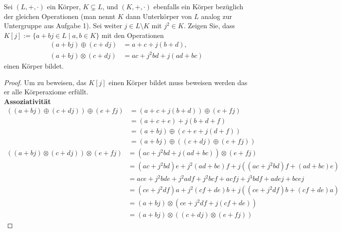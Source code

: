 \documentclass{../problemset}
\begin{document}
\pagebreak

\begin{problem}
Sei $(L, +, \cdot)$ ein Körper, $K \subsetneq L$, und $(K, +, \cdot)$ ebenfalls ein Körper bezüglich der gleichen Operationen (man nennt $K$ dann Unterkörper von $L$ analog zur Untergruppe aus Aufgabe 1). Sei weiter $j \in L \setminus K$ mit $j^2 \in K$. Zeigen Sie, dass $K[j] := \{a + bj \in L \mid a, b \in K\}$ mit den Operationen
\begin{align*}
	(a + bj) \oplus (c + dj)  & = a + c + j(b + d),       \\
	(a + bj) \otimes (c + dj) & = ac + j^2bd + j(ad + bc)
\end{align*}
einen Körper bildet.
\begin{proof}
	Um zu beweisen, das $K[j]$ einen Körper bildet muss beweisen werden das er alle Körperaxiome erfüllt. \\
	\textbf{Assoziativität} \\
	\begin{align}
		((a + bj) \oplus (c + dj)) \oplus (e + fj) & = (a + c + j(b + d)) \oplus (e + fj)         \\
		                                           & = (a + c + e ) + j(b + d + f)                \\
		                                           & = (a + bj) \oplus (c + e + j(d + f))         \\
		                                           & = (a + bj) \oplus ((c + dj) \oplus (e + fj))
	\end{align}
	\begin{align}
		((a + bj) \otimes (c + dj)) \otimes (e + fj) & = (ac + j^2bd + j(ad + bc)) \otimes (e + fj)                   \\
		                                             & = (ac+j^2bd)e + j^2(ad + bc)f + j((ac + j^2bd)f + (ad + bc)e)  \\
		                                             & = ace + j^2bde + j^2adf + j^2bcf + acfj + j^3bdf + adej + bcej \\
		                                             & = (ce+j^2df)a + j^2(cf + de)b + j((ce + j^2df)b + (cf + de)a)  \\
		                                             & = (a + bj) \otimes (ce + j^2df + j(cf + de))                   \\
		                                             & = (a + bj) \otimes ((c + dj) \otimes (e + fj))
	\end{align}

\end{proof}
\end{problem}
\end{document}
